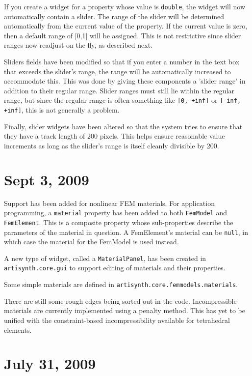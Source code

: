 \documentclass{article}
\begin{document}
If you create a widget for a property whose value is {\tt double}, the
widget will now automatically contain a slider. The range of the
slider will be determined automatically from the current value of the
property. If the current value is zero, then a default range of [0,1]
will be assigned. This is not restrictive since slider ranges now
readjust on the fly, as described next.

Sliders fields have been modified so that if you enter a number in the
text box that exceeds the slider's range, the range will be
automatically increased to accommodate this. This was done by giving
these components a 'slider range' in addition to their regular
range. Slider ranges must still lie within the regular range, but
since the regular range is often something like {\tt [0, +inf]} or 
{\tt [-inf, +inf]}, this is not generally a problem.

Finally, slider widgets have been altered so that the system tries to
ensure that they have a track length of 200 pixels.  This helps ensure
reasonable value increments as long as the slider's range is itself
cleanly divisible by 200.

\section*{Sept 3, 2009}

Support has been added for nonlinear FEM materials. For application
programming, a {\tt material} property has been added to both {\tt FemModel}
and {\tt FemElement}. This is a composite property whose sub-properties
describe the parameters of the material in question. A FemElement's
material can be {\tt null}, in which case the material for the FemModel is
used instead.

A new type of widget, called a {\tt MaterialPanel}, has been created in
{\tt artisynth.core.gui} to support editing of materials and their
properties.

Some simple materials are defined in
{\tt artisynth.core.femmodels.materials}.

There are still some rough edges being sorted out in the code.
Incompressible materials are currently implemented using a penalty
method. This has yet to be unified with the constraint-based
incompressibility available for tetrahedral elements.

\section*{July 31, 2009}
\end{document}
